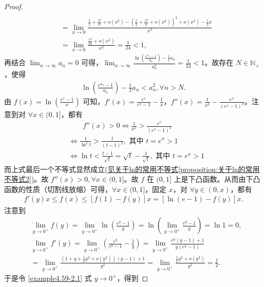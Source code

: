 \documentclass[../../main.tex]{subfiles}
\begin{document}
\begin{proof}
\begin{align*}
\\
&=\lim_{x\rightarrow 0} \frac{\frac{x}{2}+\frac{x^2}{6}+o(x^2)-\left( \frac{x}{2}+\frac{x^2}{6}+o(x^2) \right) ^2+o(x^2)-\frac{1}{2}x}{x^2}
\\
&=\lim_{x\rightarrow 0} \frac{\frac{x^2}{24}+o(x^2)}{x^2}=\frac{1}{24}<1,
\end{align*}
再结合 \(\lim_{n \to \infty} a_n = 0\) 可得，\(\lim_{n \to \infty} \frac{\ln\left(\frac{e^{a_n} - 1}{a_n}\right) - \frac{1}{2} a_n}{a_n^2} = \frac{1}{24} < 1\)。故存在 \(N \in \mathbb{N}_+\)，使得
\begin{align}
\ln\left(\frac{e^{a_n} - 1}{a_n}\right) - \frac{1}{2} a_n < a_n^2,\forall n > N. \label{example4.59-3.1}
\end{align}
由 \(f(x)=\ln\left(\frac{e^x - 1}{x}\right)\) 可知，\(f'(x)=\frac{e^x}{e^x - 1} - \frac{1}{x}\)，\(f''(x)=\frac{1}{x^2} - \frac{e^x}{(e^x - 1)^2}\)。注意到对 \(\forall x \in (0, 1]\)，都有
\begin{align*}
& \quad \quad f''(x) > 0 \Leftrightarrow \frac{1}{x^2} > \frac{e^x}{(e^x - 1)^2}\\
&\Leftrightarrow \frac{1}{\ln^2 t} > \frac{t}{(t - 1)^2},\text{ 其中 }t = e^x > 1\\
&\Leftrightarrow \ln t < \frac{t - 1}{\sqrt{t}} = \sqrt{t} - \frac{1}{\sqrt{t}},\text{ 其中 }t = e^x > 1
\end{align*}
而上式最后一个不等式显然成立\hyperref[proposition:关于ln的常用不等式2]{(见关于ln的常用不等式\ref{proposition:关于ln的常用不等式2})}。故 \(f''(x) > 0,\forall x \in (0, 1]\)。故 \(f\) 在 \((0, 1]\) 上是下凸函数。从而由下凸函数的性质（切割线放缩）可得，\(\forall x \in (0, 1]\)，固定 \(x\)，对 \(\forall y \in (0, x)\)，都有
\begin{align}
f'(y) x \leq f(x) \leq [f(1) - f(y)] x = [\ln(e - 1) - f(y)] x. \label{example4.59-2.1}
\end{align}
注意到
\begin{align*}
&\lim_{y \to 0^+} f(y) = \lim_{y \to 0^+} \ln\left(\frac{e^y - 1}{y}\right) = \ln\left(\lim_{y \to 0^+} \frac{e^y - 1}{y}\right) = \ln 1 = 0,\\
&\lim_{y \to 0^+} f'(y) = \lim_{y \to 0^+} \left(\frac{e^y}{e^y - 1} - \frac{1}{y}\right) = \lim_{y \to 0^+} \frac{e^y(y - 1) + 1}{y(e^y - 1)}\\
&= \lim_{y \to 0^+} \frac{(1 + y + \frac{1}{2} y^2 + o(y^2))(y - 1) + 1}{y^2} = \lim_{y \to 0^+} \frac{\frac{1}{2} y^2 + o(y^2)}{y^2} = \frac{1}{2}.
\end{align*}
于是令 \eqref{example4.59-2.1} 式 \(y \to 0^+\)，得到

\end{proof}
\end{document}
